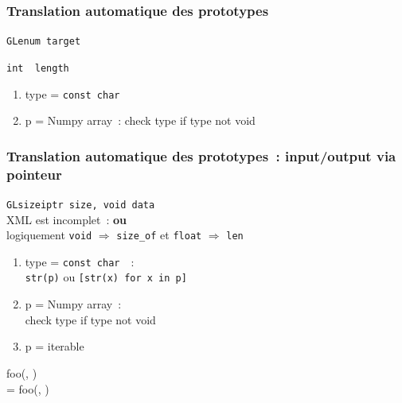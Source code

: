 \begin{frame}
  \frametitle{Translation automatique des prototypes}
  \begin{description}
    \item[simple] \texttt{GLenum target} \\
    \item[output par référence] \texttt{int \alert{\ptr [1]} length} \\
    \item[Pointeur Complexe]
      \begin{enumerate}
      \item type = \texttt{const char \ptr}
      \item p = Numpy array~: check type if type not void
      \end{enumerate}
  \end{description}
  \note{
    \begin{enumerate}
    \item 
    \end{enumerate}
  }
\end{frame}

\begin{frame}
  \frametitle{Translation automatique des prototypes~: input/output via pointeur}
  \texttt{GLsizeiptr size,  void  data} \\[.5em]
  \attention{} \alert{XML est incomplet~:  \textbf{ou} } \\
  logiquement \texttt{void} $\Longrightarrow$ \texttt{size\_of} et \texttt{float} $\Longrightarrow$ \texttt{len}
  \vspace{.5em}
  \begin{enumerate}
  \item type = \texttt{const char \ptr\ptr}~:\\
    \texttt{str(p)} ou \texttt{[str(x) for x in p]}
  \item p = Numpy array~:\\
    check type if type not void
  \item p = iterable
  \end{enumerate}
  \vspace{.5em}
   foo(, ) \\
   = foo(, )
  \note{
    \begin{enumerate}
    \item 
    \end{enumerate}
  }
\end{frame}

